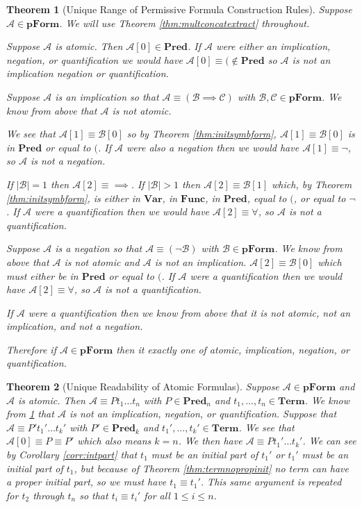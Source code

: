 \documentclass[12pt]{article}
\theoremstyle{break}
\theoremstyle{break}
\newtheorem{theorem}{Theorem}[section]
\theoremstyle{break}
\theoremstyle{break}
\theoremstyle{break}
\newtheorem{informal definition}[definition]{Informal Definition}
\newcommand{\mc}[1]{\mathcal{#1}}
\begin{document}
\begin{theorem}[Unique Range of Permissive Formula Construction Rules]
\label{thm:uniquerange}
Suppose $\mc{A}\in\textbf{pForm}$.
We will use Theorem \ref{thm:multconcatextract} throughout.

Suppose $\mc{A}$ is atomic.
Then $\mc{A}[0] \in \textbf{Pred}$.
If $\mc{A}$ were either an implication, negation, or quantification we would have $\mc{A}[0]\equiv (\not\in \textbf{Pred}$ so $\mc{A}$ is not an implication negation or quantification.



Suppose $\mc{A}$ is an implication so that $\mc{A} \equiv (\mc{B}\implies \mc{C})$ with $\mc{B},\mc{C}\in\textbf{pForm}$.
We know from above that $\mc{A}$ is not atomic.

We see that $\mc{A}[1]\equiv \mc{B}[0]$ so by Theorem \ref{thm:initsymbform}, $\mc{A}[1]\equiv\mc{B}[0]$ is in $\textbf{Pred}$ or equal to $($.
If $\mc{A}$ were also a negation then we would have $\mc{A}[1]\equiv \lnot$, so $\mc{A}$ is not a negation.

If $|\mc{B}| = 1$ then $\mc{A}[2]\equiv \implies$.
If $|\mc{B}| > 1$ then $\mc{A}[2] \equiv \mc{B}[1]$ which, by Theorem \ref{thm:initsymbform}, is either in $\textbf{Var}$, in $\textbf{Func}$, in $\textbf{Pred}$, equal to $($, or equal to $\lnot$.
If $\mc{A}$ were a quantification then we would have $\mc{A}[2] \equiv \forall$, so $\mc{A}$ is not a quantification.

Suppose $\mc{A}$ is a negation so that $\mc{A} \equiv (\lnot \mc{B})$ with $\mc{B}\in\textbf{pForm}$.
We know from above that $\mc{A}$ is not atomic and $\mc{A}$ is not an implication.
$\mc{A}[2] \equiv \mc{B}[0]$ which must either be in $\textbf{Pred}$ or equal to $($.
If $\mc{A}$ were a quantification then we would have $\mc{A}[2] \equiv \forall$, so $\mc{A}$ is not a quantification.

If $\mc{A}$ were a quantification then we know from above that it is not atomic, not an implication, and not a negation.

Therefore if $\mc{A}\in\textbf{pForm}$ then it exactly one of atomic, implication, negation, or quantification.
\end{theorem}

\begin{theorem}[Unique Readability of Atomic Formulas]
\label{thm:atomunique}
Suppose $\mc{A}\in \textbf{pForm}$ and $\mc{A}$ is atomic.
Then $\mc{A} \equiv Pt_1\ldots t_n$ with $P\in\textbf{Pred}_n$ and $t_1,\ldots,t_n\in\textbf{Term}$.
We know from \ref{thm:uniquerange} that $\mc{A}$ is not an implication, negation, or quantification.
Suppose that $\mc{A} \equiv P't_1'\ldots t_k'$ with $P'\in\textbf{Pred}_k$ and $t_1',\ldots, t_k'\in\textbf{Term}$.
We see that $\mc{A}[0] \equiv P \equiv P'$ which also means $k=n$.
We then have $\mc{A}\equiv P t_1'\ldots t_k'$.
We can see by Corollary \ref{corr:intpart} that $t_1$ must be an initial part of $t_1'$ or $t_1'$ must be an initial part of $t_1$, but because of Theorem \ref{thm:termnopropinit} no term can have a proper initial part, so we must have $t_1\equiv t_1'$.
This same argument is repeated for $t_2$ through $t_n$ so that $t_i \equiv t_i'$ for all $1 \le i \le n$.
\end{theorem}
\end{document}
